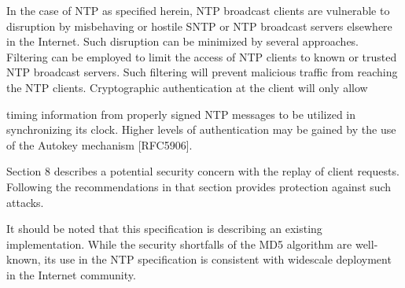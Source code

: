    In the case of NTP as specified herein, NTP broadcast clients are
   vulnerable to disruption by misbehaving or hostile SNTP or NTP
   broadcast servers elsewhere in the Internet.  Such disruption can be
   minimized by several approaches.  Filtering can be employed to limit
   the access of NTP clients to known or trusted NTP broadcast servers.
   Such filtering will prevent malicious traffic from reaching the NTP
   clients.  Cryptographic authentication at the client will only allow

   timing information from properly signed NTP messages to be utilized
   in synchronizing its clock.  Higher levels of authentication may be
   gained by the use of the Autokey mechanism [RFC5906].

   Section 8 describes a potential security concern with the replay of
   client requests.  Following the recommendations in that section
   provides protection against such attacks.

   It should be noted that this specification is describing an existing
   implementation.  While the security shortfalls of the MD5 algorithm
   are well-known, its use in the NTP specification is consistent with
   widescale deployment in the Internet community.
